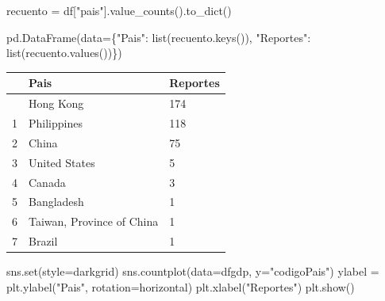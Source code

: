 \documentclass[
  letterpaper,
  DIV=11,
  numbers=noendperiod]{scrartcl}
\newenvironment{Shaded}{\begin{snugshade}}{\end{snugshade}}
\newcommand{\BuiltInTok}[1]{\textcolor[rgb]{0.00,0.23,0.31}{#1}}
\newcommand{\NormalTok}[1]{\textcolor[rgb]{0.00,0.23,0.31}{#1}}
\newcommand{\OperatorTok}[1]{\textcolor[rgb]{0.37,0.37,0.37}{#1}}
\newcommand{\StringTok}[1]{\textcolor[rgb]{0.13,0.47,0.30}{#1}}
\begin{document}
\begin{Shaded}
\begin{Highlighting}[]
\NormalTok{recuento }\OperatorTok{=}\NormalTok{ df[}\StringTok{"pais"}\NormalTok{].value\_counts().to\_dict()}

\NormalTok{pd.DataFrame(data}\OperatorTok{=}\NormalTok{\{}\StringTok{"Pais"}\NormalTok{: }\BuiltInTok{list}\NormalTok{(recuento.keys()), }\StringTok{"Reportes"}\NormalTok{: }\BuiltInTok{list}\NormalTok{(recuento.values())\})}
\end{Highlighting}
\end{Shaded}

\begin{longtable}[]{@{}lll@{}}
\toprule\noalign{}
& Pais & Reportes \\
\midrule\noalign{}
\endhead
\bottomrule\noalign{}
\endlastfoot
0 & Hong Kong & 174 \\
1 & Philippines & 118 \\
2 & China & 75 \\
3 & United States & 5 \\
4 & Canada & 3 \\
5 & Bangladesh & 1 \\
6 & Taiwan, Province of China & 1 \\
7 & Brazil & 1 \\
\end{longtable}

\begin{Shaded}
\begin{Highlighting}[]
\NormalTok{sns.}\BuiltInTok{set}\NormalTok{(style}\OperatorTok{=}\StringTok{\textquotesingle{}darkgrid\textquotesingle{}}\NormalTok{)}
\NormalTok{sns.countplot(data}\OperatorTok{=}\NormalTok{dfgdp, y}\OperatorTok{=}\StringTok{"codigoPais"}\NormalTok{)}
\NormalTok{ylabel }\OperatorTok{=}\NormalTok{ plt.ylabel(}\StringTok{"Pais"}\NormalTok{, rotation}\OperatorTok{=}\StringTok{\textquotesingle{}horizontal\textquotesingle{}}\NormalTok{)}
\NormalTok{plt.xlabel(}\StringTok{"Reportes"}\NormalTok{)}
\NormalTok{plt.show()}
\end{Highlighting}
\end{Shaded}
\end{document}
